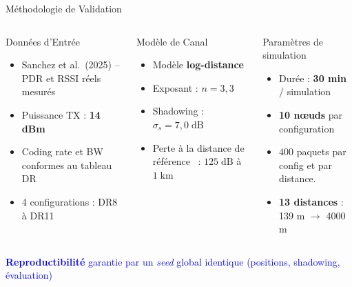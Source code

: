 \documentclass[aspectratio=169, 11pt]{beamer}
\begin{document}
	\begin{frame}{Méthodologie de Validation}
		
		\begin{columns}[T]
			
			\begin{block}{Données d'Entrée}
				\begin{itemize}\small
					\item Sanchez et al.\ (2025) -- PDR et RSSI réels mesurés
					\item Puissance TX : \textbf{14 dBm}
					\item Coding rate et BW conformes au tableau DR
					\item 4 configurations : DR8 à DR11
				\end{itemize}
			\end{block}
			
			\begin{block}{ Modèle de Canal}
				\begin{itemize}\small
					\item Modèle \textbf{log-distance}
					\item Exposant : $n = 3{,}3$
					\item Shadowing : $\sigma_s = 7{,}0\;\text{dB}$
					\item Perte à la distance de référence \ : $125\;\text{dB}$ à $1\;\text{km}$
				\end{itemize}
			\end{block}
			
			\begin{block}{Paramètres de simulation}
				\begin{itemize}\small
					\item Durée : \textbf{30 min} / simulation
					\item \textbf{10 nœuds} par configuration
					\item $400$ paquets par config et par distance.
					\item \textbf{13 distances} : 139 m $\to$ 4000 m
				\end{itemize}
			\end{block}
			
		\end{columns}
		
		\vspace{0.8em}
		\begin{tcolorbox}[
			colback=blue!5, colframe=blue, boxrule=0.8pt,
			left=6pt, right=6pt, top=4pt, bottom=4pt, sharp corners
			]
			\centering\small\textcolor{blue}{%
				 \textbf{Reproductibilité} garantie par un \textit{seed} global identique
				(positions, shadowing, évaluation)}
		\end{tcolorbox}
		
	\end{frame}
	
\end{document}
